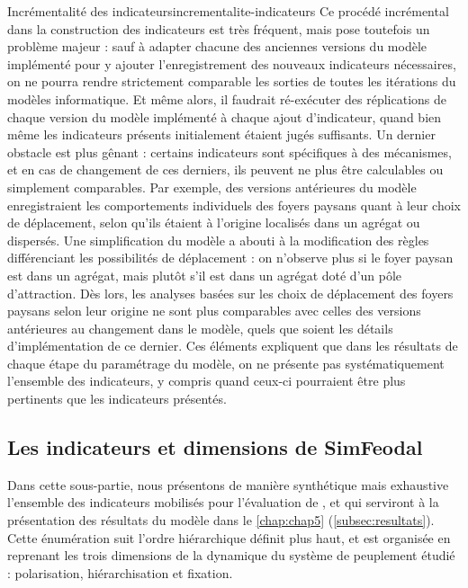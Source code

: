 \begin{encadre}{Incrémentalité des indicateurs}{incrementalite-indicateurs}
Ce procédé incrémental dans la construction des indicateurs est très fréquent, mais pose toutefois un problème majeur :
sauf à adapter chacune des anciennes versions du modèle implémenté pour y ajouter l'enregistrement des nouveaux indicateurs nécessaires, on ne pourra rendre strictement comparable les sorties de toutes les itérations du modèles informatique.
Et même alors, il faudrait ré-exécuter des réplications de chaque version du modèle implémenté à chaque ajout d'indicateur, quand bien même les indicateurs présents initialement étaient jugés suffisants.
Un dernier obstacle est plus gênant :
certains indicateurs sont spécifiques à des mécanismes, et en cas de changement de ces derniers, ils peuvent ne plus être calculables ou simplement comparables.
Par exemple, des versions antérieures du modèle enregistraient les comportements individuels des foyers paysans quant à leur \og choix\fg{} de déplacement, selon qu'ils étaient à l'origine localisés dans un agrégat ou dispersés.
Une simplification du modèle a abouti à la modification des règles différenciant les possibilités de déplacement :
on n'observe plus si le foyer paysan est dans un agrégat, mais plutôt s'il est dans un agrégat doté d'un pôle d'attraction.
Dès lors, les analyses basées sur les choix de déplacement des foyers paysans selon leur origine ne sont plus comparables avec celles des versions antérieures au changement dans le modèle, quels que soient les détails d'implémentation de ce dernier.
Ces éléments expliquent que dans les résultats de chaque étape du paramétrage du modèle, on ne présente pas systématiquement l'ensemble des indicateurs, y compris quand ceux-ci pourraient être plus pertinents que les indicateurs présentés.
\end{encadre}

\clearpage
\subsection{Les indicateurs et dimensions de SimFeodal \label{subsec:indicateurs-simfeodal}}

Dans cette sous-partie, nous présentons de manière synthétique mais exhaustive l'ensemble des indicateurs mobilisés pour l'évaluation de \simfeodal{}, et qui serviront à la présentation des résultats du modèle dans le \cref{chap:chap5} (\cref{subsec:resultats}).
Cette énumération suit l'ordre hiérarchique définit plus haut, et est organisée en reprenant les trois dimensions de la dynamique du système de peuplement étudié : polarisation, hiérarchisation et fixation.

